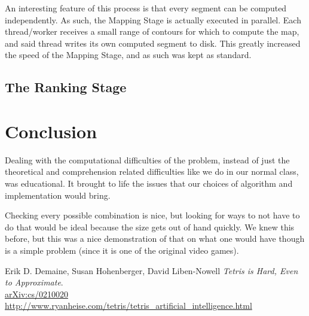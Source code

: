 \documentclass[fontsize=12pt]{article}
\begin{document}
\par An interesting feature of this process is that every segment can be computed independently. As such, the Mapping Stage is actually executed in parallel. Each thread/worker receives a small range of contours for which to compute the map, and said thread writes its own computed segment to disk. This greatly increased the speed of the Mapping Stage, and as such was kept as standard.

\subsection{The Ranking Stage}
\label{sub:the_ranking_stage}


\section{Conclusion}
\label{sec:conclusion}

\par Dealing with the computational difficulties of the problem, instead of just the theoretical and comprehension related difficulties like we do in our normal class, was educational. It brought to life the issues that our choices of algorithm and implementation would bring.

\par Checking every possible combination is nice, but looking for ways to not have to do that would be ideal because the size gets out of hand quickly. We knew this before, but this was a nice demonstration of that on what one would have though is a simple problem (since it is one of the original video games).



\newpage


\begin{thebibliography}{9}
Erik D. Demaine, Susan Hohenberger, David Liben-Nowell
\textit{
Tetris is Hard, Even to Approximate}.
\\\href{https://arxiv.org/abs/cs/0210020}{arXiv:cs/0210020}
  \url{http://www.ryanheise.com/tetris/tetris_artificial_intelligence.html}
\end{thebibliography}
\end{document}
